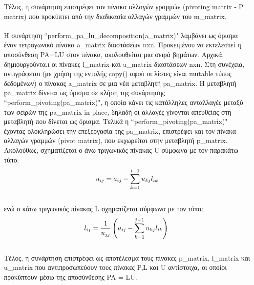 \documentclass[a4paper,11pt]{article}
\newcommand{\lt}{\latintext}
\begin{document}
Τέλος, η συνάρτηση επιστρέφει τον πίνακα αλλαγών γραμμών {\lt (pivoting matrix - P matrix)} που προκύπτει από την διαδικασία αλλαγών γραμμών του {\lt m\_matrix}.\\
\\Η συνάρτηση {\lt ``perform\_pa\_lu\_decomposition(a\_matrix)"} λαμβάνει ως όρισμα έναν τετραγωνικό πίνακα {\lt a\_matrix} διαστάσεων {\lt nxn}. Προκειμένου να εκτελεστεί η αποσύνθεση {\lt PA=LU} στον πίνακα, ακολουθείται μια σειρά βημάτων. Αρχικά, δημιουργούντα.ι οι πίνακες {\lt l\_matrix} και {\lt u\_matrix} διαστάσεων {\lt nxn}. Στη συνέχεια, αντιγράφεται (με χρήση της εντολής {\lt copy()} αφού οι λίστες είναι {\lt mutable} τύπος δεδομένων) ο πίνακας  {\lt a\_matrix} σε μια νέα μεταβλητή {\lt pa\_matrix}. Η μεταβλητή {\lt pa\_matrix} δίνεται ως όρισμα σε κλήση της συνάρτησης  {\lt ``perform\_pivoting(pa\_matrix)"}, η οποία κάνει τις κατάλληλες ανταλλαγές μεταξύ των σειρών της {\lt pa\_matrix} {\lt in-place}, δηλαδή οι αλλαγές γίνονται απευθείας στη μεταβλητή που δίνεται ως όρισμα. Τελικά η {\lt ``perform\_pivoting(pa\_matrix)"} έχοντας ολοκληρώσει την επεξεργασία της {\lt pa\_matrix}, επιστρέφει και τον πίνακα αλλαγών γραμμών {\lt (pivot matrix)}, που εκχωρείται στην μεταβλητή {\lt p\_matrix}.\\
Ακολούθως, σχηματίζεται ο άνω τριγωνικός πίνακας {\lt U} σύμφωνα με τον παρακάτω τύπο:\\
\begin{equation*}
\\u_{ij} = a_{ij} - \sum_{k=1}^{i-1} u_{kj} l_{ik}\\
\end{equation*}
\\ενώ ο κάτω τριγωνικός πίνακας {\lt L} σχηματίζεται σύμφωνα με τον τύπο:\\
\begin{equation*}
\\l_{ij} = \frac{1}{u_{jj}} \left(a_{ij} - \sum_{k=1}^{j-1} u_{kj} l_{ik} \right)\\
\end{equation*}
\\Τέλος, η συνάρτηση επιστρέφει ως αποτέλεσμα τους πίνακες {\lt p\_matrix}, {\lt l\_matrix} και {\lt u\_matrix} που αντιπροσωπεύουν τους πίνακες {\lt P},{\lt L} και {\lt U} αντίστοιχα, οι οποίοι προκύπτουν μέσω της αποσύνθεσης {\lt PA = LU}.
\end{document}
